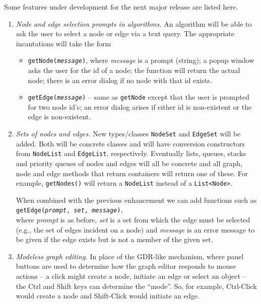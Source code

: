 Some features under development for the next major release are listed here.

\begin{enumerate}
\item
  \emph{Node and edge selection prompts in algorithms.}
  An algorithm will be able to ask the user to select a node or edge via a text query. The appropriate incantations will take the form
  \begin{itemize}
    \item \texttt{getNode(\emph{message})}, where \emph{message} is a prompt
      (string); a popup window asks the user for the id of a node; the
      function will return the actual node; there is an error dialog if
      no node with that id exists.
    \item \texttt{getEdge(\emph{message})} -- same as \texttt{getNode}
      except that the user is prompted for two node id's; an error dialog
      arises if either id is non-existent or the edge is non-existent.
  \end{itemize}

\item
  \emph{Sets of nodes and edges.}
  New types/classes \texttt{NodeSet} and \texttt{EdgeSet} will be added. Both
  will be concrete classes and will have conversion constructors from
  \texttt{NodeList} and \texttt{EdgeList}, respectively. Eventually
  lists, queues, stacks and priority queues of nodes and edges will all be
  concrete and all graph, node and edge methods that return containers will
  return one of these. For example, \texttt{getNodes()} will return a
  \texttt{NodeList} instead of a \texttt{List<Node>}.

  When combined with the previous enhancement we can add functions such as\\
  \hspace*{2em}\mbox{\texttt{getEdge(\emph{prompt}, \emph{set}, \emph{message})}},\\
  where \emph{prompt} is as before, \emph{set} is
  a set from which the edge must be selected (e.g., the set of edges incident
  on a node) and \emph{message} is an error message to be given if the
  edge exists but is not a member of the given set.

\item
  \emph{Modeless graph editing.}
  In place of the GDR-like mechanism, where panel buttons are used to determine
  how the graph editor responds to mouse actions -- a click might create a node,
  initiate an edge or select an object --
  the \textsf{Ctrl} and \textsf{Shift} keys can determine the ``mode''.
  So, for example, \textsf{Ctrl-Click} would create a node and
  \textsf{Shift-Click} would initiate an edge.


\end{enumerate}
